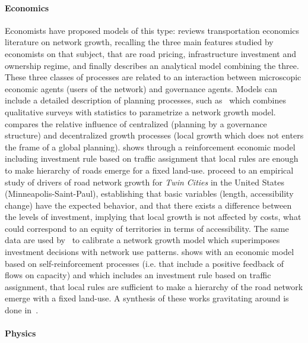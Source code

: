 \documentclass[galley]{jtlu-article-2col}
\begin{document}
\paragraph{Economics}

Economists have proposed models of this type: \cite{zhang2007economics} reviews transportation economics literature on network growth, recalling the three main features studied by economists on that subject, that are road pricing, infrastructure investment and ownership regime, and finally describes an analytical model combining the three. These three classes of processes are related to an interaction between microscopic economic agents (users of the network) and governance agents. Models can include a detailed description of planning processes, such as~\cite{levinson2012forecasting} which combines qualitative surveys with statistics to parametrize a network growth model.  \cite{xie2009jurisdictional} compares the relative influence of centralized (planning by a governance structure) and decentralized growth processes (local growth which does not enters the frame of a global planning). 
 \cite{yerra2005emergence} shows through a reinforcement economic model including investment rule based on traffic assignment that local rules are enough to make hierarchy of roads emerge for a fixed land-use. \cite{levinson2003induced} proceed to an empirical study of drivers of road network growth for \emph{Twin Cities} in the United States (Minneapolis-Saint-Paul), establishing that basic variables (length, accessibility change) have the expected behavior, and that there exists a difference between the levels of investment, implying that local growth is not affected by costs, what could correspond to an equity of territories in terms of accessibility. The same data are used by~\cite{zhang2016model} to calibrate a network growth model which superimposes investment decisions with network use patterns. \cite{yerra2005emergence} shows with an economic model based on self-reinforcement processes (i.e. that include a positive feedback of flows on capacity) and which includes an investment rule based on traffic assignment, that local rules are sufficient to make a hierarchy of the road network emerge with a fixed land-use. A synthesis of these works gravitating around  is done in~\cite{xie2011evolving}.
 
 \paragraph{Physics}
 
\end{document}
